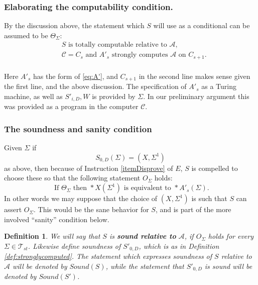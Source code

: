 \documentclass[9pt,twocolumn,twoside,lineno]{pnas-new}
\numberwithin{equation}{section}
\newtheorem{definition}[equation]{Definition}
\theoremstyle{definition}
\theoremstyle{remark}
\begin{document}
\subsubsection {Elaborating the computability condition.} %
By the discussion above, the statement  which $S$ will use as a conditional can be assumed to be $\Theta _{\Sigma} $: 
\begin{equation}
\
\begin{split} \label{eq:assertion1}
   &  \text {$S$ is totally computable relative to } \mathcal{A}, \\
   & \mathcal{C}=C _{s}  \text { and }A' _{s}  \text{ strongly computes } \mathcal{A}  \text{ on } C _{s+1}. \\
\end{split}   
 \end{equation}


Here $A' _{s} $ has the form of \eqref{eq:A'}, and $C _{s+1} $ in the second line makes sense given the first line, and the above discussion. 
The specification of $A' _{s} $ as a Turing machine, as well as $S' _{i,D}, W $  is provided by $\Sigma$. In our preliminary argument this was provided as a program in the computer $\mathcal{C}$.  
\subsubsection {The soundness and sanity condition}
Given $\Sigma$ if $$S _{0,D} (\Sigma) = (X, \Sigma ^{1}) $$ as above, then because of Instruction \ref{itemDisprove} of $E$, $S$ is compelled to choose these so that the following statement $O _{\Sigma} $ holds:
$$ \text{ If } \Theta _{\Sigma} \text{ then } *X (\Sigma ^{1} ) \text{ is equivalent to }   *A' _{s} (\Sigma).
$$  In other words we may suppose that the choice of $(X, \Sigma ^{1} )$ is such that $S$ can assert $O _{\Sigma} $. 
This would be the sane behavior for $S$, and is part of the more involved ``sanity'' condition below.
\begin{definition} \label{def:sound} We will say that $S$ is \textbf{\emph{sound relative to}} $\mathcal{A}$, if $O _{\Sigma} $ holds for every $\Sigma \in \mathcal{T} _{st} $. Likewise define soundness of $S' _{0,D} $, which is as in Definition \ref{def:stronglycomputed}. The statement which expresses soundness of $S$ relative to $\mathcal{A}$ will be denoted by $Sound (S)$, while the statement that $S' _{0,D} $  is sound will be denoted by $Sound (S')$.
\end{definition}
\end{document}

